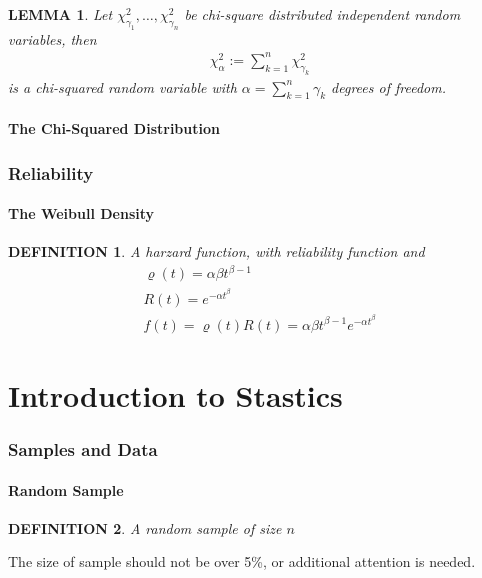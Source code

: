 \documentclass[11pt,a4paper]{article}
\newtheorem*{lemma}{\bf LEMMA}
\newtheorem*{definition}{\bf DEFINITION}
\begin{document}
\begin{lemma}
    Let $\chi^2_{\gamma_1},\dots,\chi^2_{\gamma_n}$ be chi-square distributed independent
    random variables, then
    \begin{gather*}
        \chi^2_\alpha:=\sum_{k=1}^{n}\chi^2_{\gamma_k}
    \end{gather*}
    is a chi-squared random variable with $\alpha=\sum_{k=1}^{n}\gamma_k$
    degrees of freedom.
\end{lemma}

\subsection{The Chi-Squared Distribution}

\section{Reliability}
\subsection{The Weibull Density}
\begin{definition}
    A harzard function, with reliability function and
    \begin{gather*}
        \varrho(t)=\alpha\beta t^{\beta-1}\\
        R(t)=e^{-\alpha t^\beta}\\
        f(t)=\varrho(t)R(t)=\alpha\beta t^{\beta-1}e^{-\alpha t^\beta}
    \end{gather*}
\end{definition}


\newpage

\part{Introduction to Stastics}
\section{Samples and Data}
\subsection{Random Sample}
\begin{definition}
    A random sample of size $n$
\end{definition}
The size of sample should not be over 5\%, or additional attention is needed.
\end{document}
